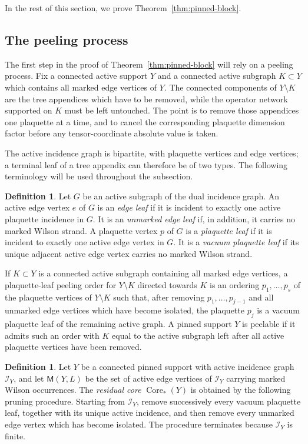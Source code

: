 \documentclass[11pt,a4paper,reqno]{amsart}
\theoremstyle{definition}
\newtheorem{definition}[theorem]{Definition}
\theoremstyle{remark}
\begin{document}
In the rest of this section, we prove Theorem~\ref{thm:pinned-block}.

\subsection{The peeling process}\label{subsec:peeling}

The first step in the proof of Theorem~\ref{thm:pinned-block} will rely on a peeling process.  Fix a connected active support $Y$ and a connected active subgraph $K\subset Y$ which contains all marked edge vertices of $Y$.
The connected components of $Y\setminus K$ are the tree appendices which have to be removed, while the operator network supported on $K$ must be left untouched.  The point is to remove those appendices one plaquette at a time, and to cancel the corresponding plaquette dimension factor before any tensor-coordinate absolute value is taken.

The active incidence graph is bipartite, with plaquette vertices and edge vertices; a terminal leaf of a tree appendix can therefore be of two types.  The following terminology will be used throughout the subsection.

\begin{definition}
Let $G$ be an active subgraph of the dual incidence graph. An active edge vertex $e$ of $G$ is an \emph{edge leaf} if it is incident to exactly one active plaquette incidence in $G$.  It is an \emph{unmarked edge leaf} if, in addition, it carries no marked Wilson strand. A plaquette vertex $p$ of $G$ is a \emph{plaquette leaf} if it is incident to exactly one active edge vertex in $G$.  It is a \emph{vacuum plaquette leaf} if its unique adjacent active edge vertex carries no marked Wilson strand.
\end{definition}

If $K\subset Y$ is a connected active subgraph containing all marked edge vertices, a plaquette-leaf peeling order for $Y\setminus K$ directed towards $K$ is an ordering $p_1,\ldots,p_s$ of the plaquette vertices of $Y\setminus K$ such that, after removing $p_1,\ldots,p_{j-1}$ and all unmarked edge vertices which have become isolated, the plaquette $p_j$ is a vacuum plaquette leaf of the remaining active graph.  A pinned support $Y$ is peelable if it admits such an order with $K$ equal to the active subgraph left after all active plaquette vertices have been removed.

\begin{definition}\label{def:anchored-core}
Let $Y$ be a connected pinned support with active incidence graph $\mathcal I_Y$, and let $\mathsf M(Y,L)$ be the set of active edge vertices of $\mathcal I_Y$ carrying marked Wilson occurrences.  The \emph{residual core} $\operatorname{Core}_*(Y)$ is obtained by the following pruning procedure.  Starting from $\mathcal I_Y$, remove successively every vacuum plaquette leaf, together with its unique active incidence, and then remove every unmarked edge vertex which has become isolated.  The procedure terminates because $\mathcal I_Y$ is finite.
\end{definition}
\end{document}
